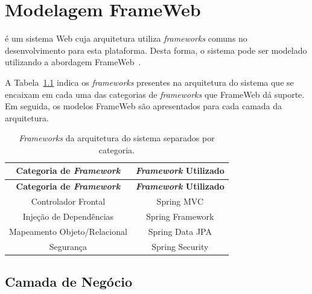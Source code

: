 
\chapter{Modelagem FrameWeb}
\label{sec-frameweb}
\vspace{-1cm}

\emph{\imprimirtitulo} é um sistema Web cuja arquitetura utiliza \textit{frameworks} comuns no desenvolvimento para esta plataforma. Desta forma, o sistema pode ser modelado utilizando a abordagem FrameWeb~\cite{souza-celebratingfalbo20}.

A Tabela~\ref{tabela-frameworks} indica os \textit{frameworks} presentes na arquitetura do sistema que se encaixam em cada uma das categorias de \textit{frameworks} que FrameWeb dá suporte. Em seguida, os modelos FrameWeb são apresentados para cada camada da arquitetura.



\begin{footnotesize}
	\begin{longtable}{|c|c|}
		\caption{\textit{Frameworks} da arquitetura do sistema separados por categoria.}
		\label{tabela-frameworks}\\\hline
		
		\rowcolor{lightgray}
		\textbf{Categoria de \textit{Framework}} & \textbf{\textit{Framework} Utilizado} \\\hline 
		\endfirsthead
		\hline
		\rowcolor{lightgray}
		\textbf{Categoria de \textit{Framework}} & \textbf{\textit{Framework} Utilizado} \\\hline 
		\endhead

		Controlador Frontal & Spring MVC \\\hline

		Injeção de Dependências & Spring Framework \\\hline

		Mapeamento Objeto/Relacional & Spring Data JPA \\\hline

		Segurança & Spring Security \\\hline
	\end{longtable}
\end{footnotesize}




\section{Camada de Negócio}
\label{sec-frameweb-negocio}

